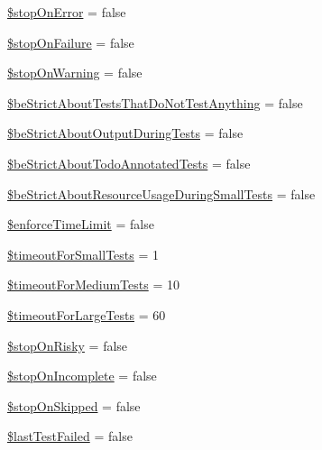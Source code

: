 \begin{DoxyCompactItemize}
\item 
\mbox{\hyperlink{class_p_h_p_unit___framework___test_result_aedd2769880079442d76210e5e64831d2}{\$stop\+On\+Error}} = false
\item 
\mbox{\hyperlink{class_p_h_p_unit___framework___test_result_a033dfc46c242ebcec96e66a97af83d3c}{\$stop\+On\+Failure}} = false
\item 
\mbox{\hyperlink{class_p_h_p_unit___framework___test_result_a14ba84fd83c058450b1f408884948ef4}{\$stop\+On\+Warning}} = false
\item 
\mbox{\hyperlink{class_p_h_p_unit___framework___test_result_aa96a6f6303faf1e2ed2b785991e70c9d}{\$be\+Strict\+About\+Tests\+That\+Do\+Not\+Test\+Anything}} = false
\item 
\mbox{\hyperlink{class_p_h_p_unit___framework___test_result_a924cd8e118193169afe0a97afe9ac291}{\$be\+Strict\+About\+Output\+During\+Tests}} = false
\item 
\mbox{\hyperlink{class_p_h_p_unit___framework___test_result_ace50dc35808c33dcf20ec0f4f68ac0ee}{\$be\+Strict\+About\+Todo\+Annotated\+Tests}} = false
\item 
\mbox{\hyperlink{class_p_h_p_unit___framework___test_result_a93f9de502edfb5b248e39fd1b0a7442a}{\$be\+Strict\+About\+Resource\+Usage\+During\+Small\+Tests}} = false
\item 
\mbox{\hyperlink{class_p_h_p_unit___framework___test_result_adedb58b62975770487aeed0b8dac1692}{\$enforce\+Time\+Limit}} = false
\item 
\mbox{\hyperlink{class_p_h_p_unit___framework___test_result_ad3abaa0162a93197b296d1d565fbfcbb}{\$timeout\+For\+Small\+Tests}} = 1
\item 
\mbox{\hyperlink{class_p_h_p_unit___framework___test_result_a61f45d8592dd5b2909e0e938d4617e0c}{\$timeout\+For\+Medium\+Tests}} = 10
\item 
\mbox{\hyperlink{class_p_h_p_unit___framework___test_result_a2a72ae22280608c7bec189354407400c}{\$timeout\+For\+Large\+Tests}} = 60
\item 
\mbox{\hyperlink{class_p_h_p_unit___framework___test_result_a2f35aa685312de26c876665b9c719d1a}{\$stop\+On\+Risky}} = false
\item 
\mbox{\hyperlink{class_p_h_p_unit___framework___test_result_a8c847d34db7e020f0b8021d8f4512219}{\$stop\+On\+Incomplete}} = false
\item 
\mbox{\hyperlink{class_p_h_p_unit___framework___test_result_a2d4e408e40cc698ea6a8d45a27f28362}{\$stop\+On\+Skipped}} = false
\item 
\mbox{\hyperlink{class_p_h_p_unit___framework___test_result_aaf57dc4adb04a3dbb164c0524657c562}{\$last\+Test\+Failed}} = false
\end{DoxyCompactItemize}



